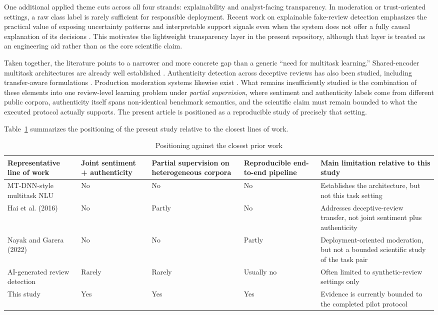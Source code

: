 \documentclass[12pt,a4paper]{article}
\begin{document}
One additional applied theme cuts across all four strands: explainability and analyst-facing transparency. In moderation or trust-oriented settings, a raw class label is rarely sufficient for responsible deployment. Recent work on explainable fake-review detection emphasizes the practical value of exposing uncertainty patterns and interpretable support signals even when the system does not offer a fully causal explanation of its decisions \cite{shajalal2024}. This motivates the lightweight transparency layer in the present repository, although that layer is treated as an engineering aid rather than as the core scientific claim.

Taken together, the literature points to a narrower and more concrete gap than a generic ``need for multitask learning.'' Shared-encoder multitask architectures are already well established \cite{liu2019}. Authenticity detection across deceptive reviews has also been studied, including transfer-aware formulations \cite{hai2016}. Production moderation systems likewise exist \cite{nayak2022}. What remains insufficiently studied is the combination of these elements into one review-level learning problem under \emph{partial supervision}, where sentiment and authenticity labels come from different public corpora, authenticity itself spans non-identical benchmark semantics, and the scientific claim must remain bounded to what the executed protocol actually supports. The present article is positioned as a reproducible study of precisely that setting.

Table~\ref{tab:related} summarizes the positioning of the present study relative to the closest lines of work.

\begin{table}[h]
\centering
\caption{Positioning against the closest prior work}
\label{tab:related}
\begin{tabularx}{\textwidth}{>{\raggedright\arraybackslash}p{3.2cm} >{\centering\arraybackslash}p{1.8cm} >{\centering\arraybackslash}p{2.3cm} >{\centering\arraybackslash}p{2.2cm} X}
\toprule
Representative line of work & Joint sentiment + authenticity & Partial supervision on heterogeneous corpora & Reproducible end-to-end pipeline & Main limitation relative to this study \\
\midrule
MT-DNN-style multitask NLU & No & No & No & Establishes the architecture, but not this task setting \\
Hai et al. (2016) & No & Partly & No & Addresses deceptive-review transfer, not joint sentiment plus authenticity \\
Nayak and Garera (2022) & No & No & Partly & Deployment-oriented moderation, but not a bounded scientific study of the task pair \\
AI-generated review detection & Rarely & Rarely & Usually no & Often limited to synthetic-review settings only \\
This study & Yes & Yes & Yes & Evidence is currently bounded to the completed pilot protocol \\
\bottomrule
\end{tabularx}
\end{table}
\end{document}
